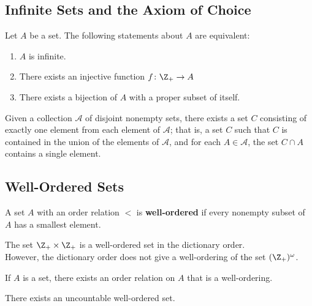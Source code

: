 \subsection{Infinite Sets and the Axiom of Choice}

\begin{theorem}
Let $A$ be a set. The following statements about $A$ are equivalent:
\begin{enumerate}
    \item $A$ is infinite.
    \item There exists an injective function $f \colon \Z_+ \rightarrow A$
    \item There exists a bijection of $A$ with a proper subset of itself.
\end{enumerate}
\end{theorem}

\begin{theorem}
Given a collection $\mathcal{A}$ of disjoint nonempty sets, there exists a set $C$ consisting of exactly
one element from each element of $\mathcal{A}$; that is, a set $C$ such that $C$ is contained in the union of the
elements of $\mathcal{A}$, and for each $A \in \mathcal{A}$, the set $C \cap A$ contains a single element.
\end{theorem}

\subsection{Well-Ordered Sets}

\begin{definition}
A set $A$ with an order relation $<$ is \textbf{well-ordered} if every nonempty subset of $A$ has a smallest element.
\end{definition}

\begin{eg}
The set $\Z_+ \times \Z_+$ is a well-ordered set in the dictionary order. \\

However, the dictionary order does not give a well-ordering of the set $(\Z_+)^\omega$.
\end{eg}

\begin{theorem}
If $A$ is a set, there exists an order relation on $A$ that is a well-ordering.
\end{theorem}

\begin{corollary}
There exists an uncountable well-ordered set.    
\end{corollary}

